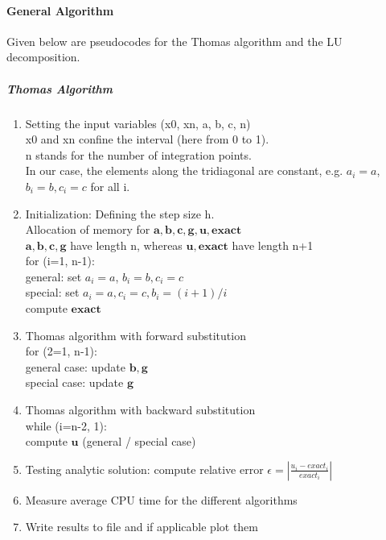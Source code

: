 \documentclass[%
oneside,                 %
final,                   %
10pt]{article}
\begin{document}
\paragraph{General Algorithm}
Given below are pseudocodes for the Thomas algorithm and the LU decomposition.
\subparagraph{Thomas Algorithm}
\begin{enumerate}
\item Setting the input variables (x0, xn, a, b, c, n) \\
	x0 and xn confine the interval (here from 0 to 1). \\
	n stands for the number of integration points. \\
	In our case, the elements along the tridiagonal are constant, e.g. $a_i=a$, $b_i=b, c_i=c$ for all i. 
	
\item Initialization: Defining the step size h. \\
	Allocation of memory for $ \mathbf{a}, \mathbf{b}, \mathbf{c}, \mathbf{g}, \mathbf{u}, \mathbf{exact}$\\
	 $ \mathbf{a}, \mathbf{b}, \mathbf{c}, \mathbf{g}$ have length n, whereas $\mathbf{u}, \mathbf{exact}$ have length n+1\\
	for (i=1, n-1): \\
		 general: set $a_i=a$, $b_i=b, c_i=c$ \\
		 special: set $a_i=a, c_i=c, b_i=(i+1)/i$ \\
		 compute $\mathbf{exact}$  

\item Thomas algorithm with forward substitution\\
	 for (2=1, n-1):\\
	general case: update $\mathbf{b}, \mathbf{g}$ \\
	special case: update $\mathbf{g}$

\item Thomas algorithm with backward substitution \\
	 while (i=n-2, 1):\\ 
	 compute $\mathbf{u}$ (general / special case)

\item Testing analytic solution: compute relative error $  \epsilon =  \left\lvert \frac{u_i-exact_i}{exact_i} \right\rvert$ 

\item Measure average CPU time for the different algorithms

\item Write results to file and if applicable plot them
\end{enumerate}
\end{document}
